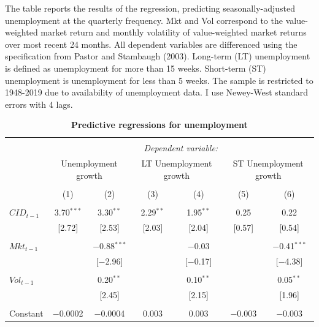 \documentclass[12pt]{article}
\begin{document}
\begin{table}[!htbp] \centering 
  \caption{\textbf{Predictive regressions for unemployment}} 
  \label{} 
        \begin{flushleft}
    {\medskip\small
 The table reports the results of the regression, predicting seasonally-adjusted unemployment at the quarterly frequency. Mkt and Vol correspond to the value-weighted market return and monthly volatility of value-weighted market returns over most recent 24 months. All dependent variables are differenced using the specification from Pastor and Stambaugh (2003). Long-term (LT) unemployment is defined as unemployment for more than 15 weeks. Short-term (ST) unemployment is unemployment for less than 5 weeks. The sample is restricted to 1948-2019 due to availability of unemployment data. I use Newey-West standard errors with 4 lags.}
    \medskip
    \end{flushleft}
\begin{tabular}{@{\extracolsep{5pt}}lcccccc} 
\\[-1.8ex]\hline 
\hline \\[-1.8ex] 
 & \multicolumn{6}{c}{\textit{Dependent variable:}} \\ 
\cline{2-7} 
 & \multicolumn{2}{c}{Unemployment growth} & \multicolumn{2}{c}{LT Unemployment growth} & \multicolumn{2}{c}{ST Unemployment growth} \\ 
\\[-1.8ex] & (1) & (2) & (3) & (4) & (5) & (6)\\ 
\hline \\[-1.8ex] 
 $CID_{t-1}$ & 3.70$^{***}$ & 3.30$^{**}$ & 2.29$^{**}$ & 1.95$^{**}$ & 0.25 & 0.22 \\ 
  & [2.72] & [2.53] & [2.03] & [2.04] & [0.57] & [0.54] \\ 
  & & & & & & \\ 
 $Mkt_{t-1}$ &  & $-$0.88$^{***}$ &  & $-$0.03 &  & $-$0.41$^{***}$ \\ 
  &  & [$-$2.96] &  & [$-$0.17] &  & [$-$4.38] \\ 
  & & & & & & \\ 
 $Vol_{t-1}$ &  & 0.20$^{**}$ &  & 0.10$^{**}$ &  & 0.05$^{**}$ \\ 
  &  & [2.45] &  & [2.15] &  & [1.96] \\ 
  & & & & & & \\ 
 Constant & $-$0.0002 & $-$0.0004 & 0.003 & 0.003 & $-$0.003 & $-$0.003 \\ 

\end{tabular}
\end{table}
\end{document}
